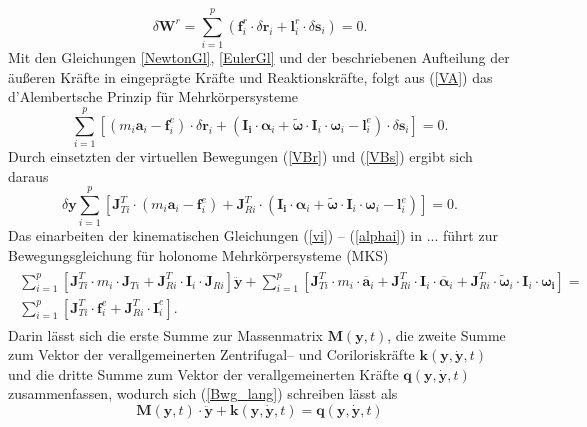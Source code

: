 \begin{equation}\label{VA}
\delta\pmb{W}^r = \sum_{i=1}^p(\pmb{f}_i^r\cdot \delta \pmb{r}_i + \pmb{l}^r_i\cdot\delta\pmb{s}_i)=0.
\end{equation}
Mit den Gleichungen \ref{NewtonGl}, \ref{EulerGl} und der beschriebenen Aufteilung der äußeren Kräfte in eingeprägte Kräfte und Reaktionskräfte, folgt aus (\ref{VA}) das d’Alembertsche Prinzip für Mehrkörpersysteme
\begin{equation}\label{VA}
\sum_{i=1}^p\left[ (m_i\pmb{a}_i-\pmb{f}_i^e)\cdot \delta \pmb{r}_i + (\pmb{I_i}\cdot \pmb{\alpha}_i + \tilde{\pmb{\omega}}\cdot\pmb{I}_i\cdot\pmb{\omega}_i-\pmb{l}^e_i)\cdot\delta\pmb{s}_i\right] =0.
\end{equation}
Durch einsetzten der virtuellen Bewegungen (\ref{VBr}) und (\ref{VBs}) ergibt sich daraus
\begin{equation}
\delta\pmb{y}\sum_{i=1}^p\left[\pmb{J}^T_{Ti}\cdot(m_i\pmb{a}_i-\pmb{f}_i^e)+ \pmb{J}^T_{Ri}\cdot(\pmb{I_i}\cdot \pmb{\alpha}_i + \tilde{\pmb{\omega}}\cdot\pmb{I}_i\cdot\pmb{\omega}_i-\pmb{l}^e_i)\right]=0.
\end{equation}
Das einarbeiten der kinematischen Gleichungen (\ref{vi}) -- (\ref{alphai}) in ... führt zur Bewegungsgleichung für holonome Mehrkörpersysteme (MKS) 
\begin{align}\label{Bwg_lang}
\begin{split}
\sum_{i=1}^p\left[\pmb{J}_{Ti}^T\cdot m_i \cdot \pmb{J}_{Ti} + \pmb{J}_{Ri}^T\cdot \pmb{I}_i \cdot \pmb{J}_{Ri}\right]\ddot{\pmb{y}}+\sum_{i=1}^p\left[\pmb{J}_{Ti}^T\cdot m_i \cdot \overline{\pmb{a}}_i + \pmb{J}^T_{Ri}\cdot\pmb{I}_i\cdot\overline{\pmb{\alpha}}_i+\pmb{J}^T_{Ri}\cdot\tilde{\pmb{\omega}}_i\cdot\pmb{I}_i\cdot\pmb{\omega_i}\right]=\\ \sum_{i=1}^p\left[\pmb{J}^T_{Ti}\cdot\pmb{f}_i^e + \pmb{J}_{Ri}^T\cdot\pmb{I}_i^e\right].
\end{split}
\end{align}
Darin lässt sich die erste Summe zur Massenmatrix $\pmb{M}(\pmb{y},t)$, die zweite Summe zum Vektor der verallgemeinerten Zentrifugal-- und Coriloriskräfte $\pmb{k}(\pmb{y},\dot{\pmb{y}},t)$ und die dritte Summe zum Vektor der verallgemeinerten Kräfte $\pmb{q}(\pmb{y},\dot{\pmb{y}},t)$ zusammenfassen, wodurch sich (\ref{Bwg_lang}) schreiben lässt als
\begin{equation}\label{Bwg}
\pmb{M}(\pmb{y},t)\cdot\ddot{\pmb{y}}+\pmb{k}(\pmb{y},\dot{\pmb{y}},t) = \pmb{q}(\pmb{y},\dot{\pmb{y}},t)
\end{equation} 
  
